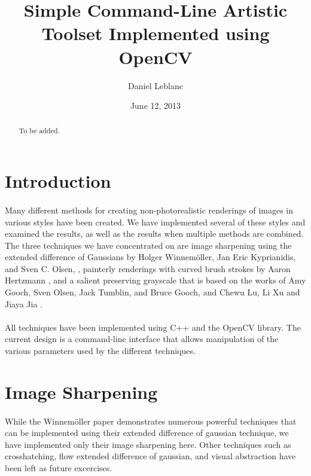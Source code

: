\documentclass[10pt,twocolumn]{article}
\author{Daniel Leblanc}
\affil{Maseeh College of Engineering and Computer Science\\Portland State University\\Portland, OR}
\title{Simple Command-Line Artistic Toolset Implemented using OpenCV}
\date{June 12, 2013}
\begin{document}
\maketitle

\begin{abstract}
To be added.
\end{abstract}

\section{Introduction}
	\paragraph{}Many different methods for creating non-photorealistic renderings of images in various styles have been created.  We have implemented several of these styles and examined the results, as well as the results when multiple methods are combined.  The three techniques we have concentrated on are image sharpening using the extended difference of Gaussians by Holger Winnem{\"o}ller, Jan Eric Kyprianidis,  and Sven C. Olsen, \cite{ Winnemoeller:2012:XED}, painterly renderings with curved brush strokes by Aaron Hertzmann \cite{Hertzmann:1998:PRC:280814.280951}, and a salient preserving grayscale that is based on the works of Amy Gooch, Sven Olsen, Jack Tumblin, and Bruce Gooch, \cite{Gooch05color2gray:salience-preserving} and Chewu Lu, Li Xu and Jiaya Jia \cite{ lu:real-time}.
	\paragraph{} All techniques have been implemented using C++ and the OpenCV library.  The current design is a command-line interface that allows manipulation of the various parameters used by the different techniques.

\section{Image Sharpening}
	\paragraph{} While the Winnem{\"o}ller paper demonstrates numerous powerful techniques that can be implemented using their extended difference of gaussian technique, we have implemented only their image sharpening here.  Other techniques such as crosshatching, flow extended difference of gaussian, and visual abstraction\cite{Winnemoeller:2012:XED} have been left as future excercises.
\end{document}
